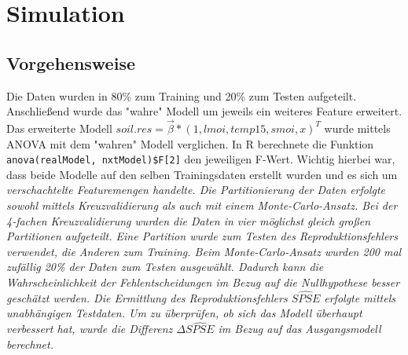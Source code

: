 \section{Simulation}
\subsection{Vorgehensweise}
Die Daten wurden in 80\% zum Training und 20\% zum Testen aufgeteilt.
Anschließend wurde das "wahre" Modell um jeweils ein weiteres Feature erweitert.
Das erweiterte Modell $soil.res = \vec{\beta} * (1,lmoi,temp15,smoi,x)^T$ wurde mittels ANOVA mit dem "wahren" Modell verglichen.
In R berechnete die Funktion \lstinline|anova(realModel, nxtModel)$F[2]| den jeweiligen F-Wert.
Wichtig hierbei war, dass beide Modelle auf den selben Trainingsdaten erstellt wurden und es sich um \it{verschachtelte} Featuremengen handelte.
Die Partitionierung der Daten erfolgte sowohl mittels Kreuzvalidierung als auch mit einem Monte-Carlo-Ansatz.
Bei der 4-fachen Kreuzvalidierung wurden die Daten in vier möglichst gleich großen Partitionen aufgeteilt.
Eine Partition wurde zum Testen des Reproduktionsfehlers verwendet, die Anderen zum Training.
Beim Monte-Carlo-Ansatz wurden 200 mal zufällig 20\% der Daten zum Testen ausgewählt.
Dadurch kann die Wahrscheinlichkeit der Fehlentscheidungen im Bezug auf die Nullhypothese besser geschätzt werden.
Die Ermittlung des Reproduktionsfehlers $\widehat{SPSE}$ erfolgte mittels unabhängigen Testdaten.
Um zu überprüfen, ob sich das Modell überhaupt verbessert hat, wurde die Differenz $\Delta \widehat{SPSE}$ im Bezug auf das Ausgangsmodell berechnet.

